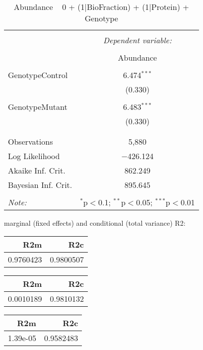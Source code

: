 \documentclass[11pt]{report}
\begin{document}
\begin{table}[!htbp] \centering 
  \caption{Abundance ~ 0 + (1|BioFraction) + (1|Protein) + Genotype} 
  \label{} 
\begin{tabular}{@{\extracolsep{5pt}}lc} 
\\[-1.8ex]\hline 
\hline \\[-1.8ex] 
 & \multicolumn{1}{c}{\textit{Dependent variable:}} \\ 
\cline{2-2} 
\\[-1.8ex] & Abundance \\ 
\hline \\[-1.8ex] 
 GenotypeControl & 6.474$^{***}$ \\ 
  & (0.330) \\ 
  & \\ 
 GenotypeMutant & 6.483$^{***}$ \\ 
  & (0.330) \\ 
  & \\ 
\hline \\[-1.8ex] 
Observations & 5,880 \\ 
Log Likelihood & $-$426.124 \\ 
Akaike Inf. Crit. & 862.249 \\ 
Bayesian Inf. Crit. & 895.645 \\ 
\hline 
\hline \\[-1.8ex] 
\textit{Note:}  & \multicolumn{1}{r}{$^{*}$p$<$0.1; $^{**}$p$<$0.05; $^{***}$p$<$0.01} \\ 
\end{tabular} 
\end{table} 
marginal (fixed effects) and conditional (total variance) R2:

\begin{tabular}{r|r}
\hline
R2m & R2c\\
\hline
0.9760423 & 0.9800507\\
\hline
\end{tabular}

\begin{tabular}{r|r}
\hline
R2m & R2c\\
\hline
0.0010189 & 0.9810132\\
\hline
\end{tabular}

\begin{tabular}{r|r}
\hline
R2m & R2c\\
\hline
1.39e-05 & 0.9582483\\
\hline
\end{tabular}
\end{document}
